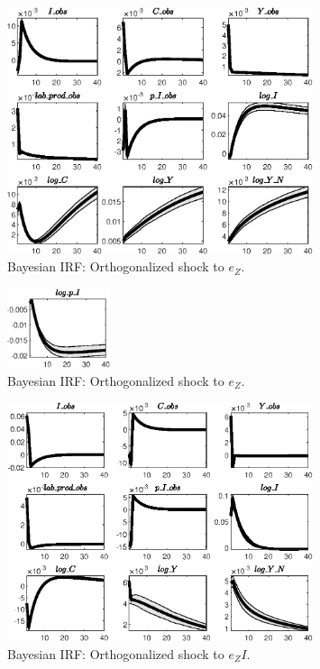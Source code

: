  
\begin{figure}[H]
\centering 
\includegraphics[width=0.80\textwidth]{BRS_fd/Output/BRS_fd_Bayesian_IRF_e_Z_1}
\caption{Bayesian IRF: Orthogonalized shock to ${e_Z}$.}
\label{Fig:BayesianIRF:e_Z:1}
\end{figure}
 
\begin{figure}[H]
\centering 
\includegraphics[width=0.27\textwidth]{BRS_fd/Output/BRS_fd_Bayesian_IRF_e_Z_2}
\caption{Bayesian IRF: Orthogonalized shock to ${e_Z}$.}
\label{Fig:BayesianIRF:e_Z:2}
\end{figure}
 
\begin{figure}[H]
\centering 
\includegraphics[width=0.80\textwidth]{BRS_fd/Output/BRS_fd_Bayesian_IRF_e_ZI_1}
\caption{Bayesian IRF: Orthogonalized shock to ${e_ZI}$.}
\label{Fig:BayesianIRF:e_ZI:1}
\end{figure}
 
